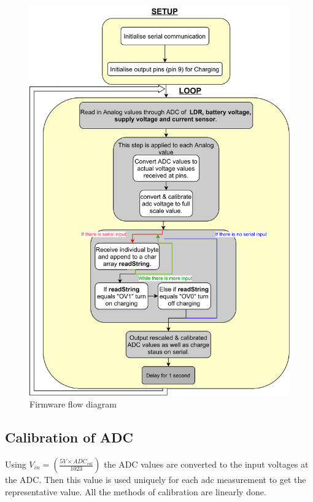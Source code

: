 \begin{figure}[!htb]
	\centering
	\includegraphics[width=0.6\linewidth]{Figures/A8/flowfirmware.png}
	\caption{Firmware flow diagram}
	\label{fig:flow}
\end{figure}

\subsection{Calibration of ADC}
Using $V_{in}=(\frac{5V\times ADC_{val} }{1023})$ the ADC values are converted to the input voltages at the ADC. Then this value is used uniquely for each adc measurement to get the representative value. All the methods of calibration are linearly done.






